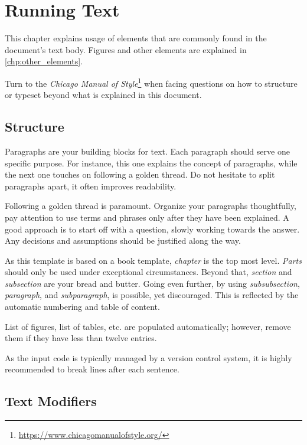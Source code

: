 \chapter{Running Text}
\label{chp:running_text}

This chapter explains usage of elements that are commonly found in the document's text body.
Figures and other elements are explained in \cref{chp:other_elements}.

Turn to the \emph{Chicago Manual of Style}\footnote{\url{https://www.chicagomanualofstyle.org/}} when facing questions on how to structure or typeset beyond what is explained in this document.

\section{Structure}

Paragraphs are your building blocks for text.
Each paragraph should serve one specific purpose.
For instance, this one explains the concept of paragraphs, while the next one touches on following a golden thread.
Do not hesitate to split paragraphs apart, it often improves readability.

Following a golden thread is paramount.
Organize your paragraphs thoughtfully, pay attention to use terms and phrases only after they have been explained.
A good approach is to start off with a question, slowly working towards the answer.
Any decisions and assumptions should be justified along the way.

As this template is based on a book template, \emph{chapter} is the top most level.
\emph{Parts} should only be used under exceptional circumstances.
Beyond that, \emph{section} and \emph{subsection} are your bread and butter.
Going even further, by using \emph{subsubsection}, \emph{paragraph}, and \emph{subparagraph}, is possible, yet discouraged.
This is reflected by the automatic numbering and table of content.

List of figures, list of tables, etc. are populated automatically; however, remove them if they have less than twelve entries.

As the input code is typically managed by a version control system, it is highly recommended to break lines after each sentence.

\section{Text Modifiers}

